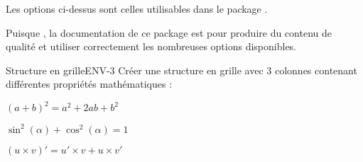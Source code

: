 \begin{Remarque}
    Les options ci-dessus sont celles utilisables dans le package .    
    
    Puisque , la documentation de ce package est  pour produire du contenu de qualité et utiliser correctement les nombreuses options disponibles. 
\end{Remarque}
\begin{EXO}{Structure en grille}{ENV-3}
    Créer une structure en grille avec 3 colonnes contenant différentes propriétés mathématiques :

\begin{tcolorbox}[blankest]
    \begin{tcbraster}[
            raster columns=3, 
            size=fbox,
            raster width=0.99\textwidth, 
            raster equal height, 
            raster column skip=1pt, 
            raster row skip=1pt
        ]
        \begin{tcolorbox}[title=Produit remarquable]
            \begin{center}
            $(a+b)^2 = a^2 + 2ab + b^2$
            \end{center}
        \end{tcolorbox}
        \begin{tcolorbox}[title=Identité trigonométrique]
            \begin{center}
            $\sin^2(\alpha) + \cos^2(\alpha) = 1$
            \end{center}
        \end{tcolorbox}
        \begin{tcolorbox}[title=Dérivée d'un produit]
            \begin{center}
            $(u \times v)' = u' \times v + u \times v'$
            \end{center}
        \end{tcolorbox}
    \end{tcbraster}
\end{tcolorbox}

\exocorrection


\end{EXO}
